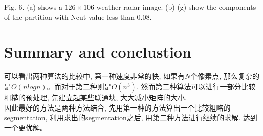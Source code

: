 \documentclass[paper=a4, fontsize=11pt]{scrartcl} %
\numberwithin{equation}{section} %
\numberwithin{figure}{section} %
\numberwithin{table}{section} %
\begin{document}
	Fig. 6. (a) shows a $126 \times  106 $ weather radar image. (b)-(g) show the components of the partition with Ncut value less than 0.08.

\section{Summary and conclustion}

可以看出两种算法的比较中, 第一种速度非常的快, 如果有$N$个像素点, 那么复杂的是$O(nlogn)$。而对于第二种则是$O(n^3)$. 然而第二种算法可以进行一部分比较粗糙的预处理, 先建立起某些联通块, 大大减小矩阵的大小.\\
因此最好的方法是两种方法结合, 先用第一种的方法算出一个比较粗略的segmentation, 利用求出的segmentation之后, 用第二种方法进行继续的求解. 达到一个更优解。
\end{document}
